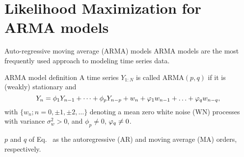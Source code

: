 \documentclass[aspectratio=169]{beamer}\usepackage[]{graphicx}\usepackage[]{xcolor}
\begin{document}
\section{Likelihood Maximization for ARMA models}

\begin{frame}{Auto-regressive moving average (ARMA) models}
  ARMA models are the most frequently used approach to modeling time series data.
  
  \begin{block}{ARMA model definition}
    A time series $Y_{1:N}$ is called ARMA$(p, q)$ if it is (weakly) stationary and
    \begin{equation}
    Y_n = \phi_1Y_{n - 1} + \cdots + \phi_pY_{n - p} + w_n + \varphi_1w_{n-1} + \ldots + \varphi_qw_{n - q},\label{eq:arma}
    \end{equation}
    with $\{w_n; n = 0, \pm1, \pm2, \ldots\}$ denoting a mean zero white noise (WN) processes with variance $\sigma_w^2 > 0$, and $\phi_p \neq 0$, $\varphi_q \neq 0$.
  \end{block}
  
  $p$ and $q$ of Eq.~ as the autoregressive (AR) and moving average (MA) orders, respectively.
\end{frame}
\end{document}
